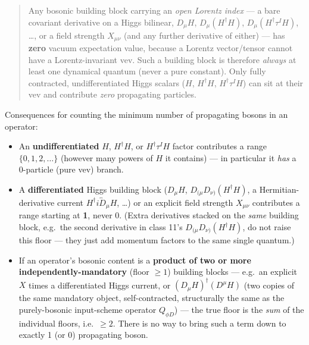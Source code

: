\documentclass[11pt,a4paper]{article}
\begin{document}
\begin{quote}
Any bosonic building block carrying an \emph{open Lorentz index} ---
a bare covariant derivative on a Higgs bilinear, $D_\mu H$, $D_\mu(H^\dagger
H)$, $D_\mu(H^\dagger\tau^I H)$, \ldots, or a field strength $X_{\mu\nu}$
(and any further derivative of either) --- has \textbf{zero} vacuum
expectation value, because a Lorentz vector/tensor cannot have a
Lorentz-invariant vev. Such a building block is therefore \emph{always} at
least one dynamical quantum (never a pure constant). Only fully contracted,
undifferentiated Higgs scalars ($H$, $H^\dagger H$, $H^\dagger\tau^I H$)
can sit at their vev and contribute \emph{zero} propagating particles.
\end{quote}

Consequences for counting the minimum number of propagating bosons in an
operator:
\begin{itemize}
\item An \textbf{undifferentiated} $H$, $H^\dagger H$, or $H^\dagger\tau^I H$
  factor contributes a range $\{0, 1, 2, \ldots\}$ (however many powers of
  $H$ it contains) --- in particular it \emph{has} a 0-particle (pure vev)
  branch.
\item A \textbf{differentiated} Higgs building block ($D_\mu H$,
  $D_{(\mu}D_{\nu)}(H^\dagger H)$, a Hermitian-derivative current
  $H^\dagger i\overleftrightarrow D_\mu H$, \ldots) or an explicit field
  strength $X_{\mu\nu}$ contributes a range starting at \textbf{1}, never 0.
  (Extra derivatives stacked on the \emph{same} building block, e.g.\ the
  second derivative in class 11's $D_{(\mu}D_{\nu)}(H^\dagger H)$, do not
  raise this floor --- they just add momentum factors to the same single
  quantum.)
\item If an operator's bosonic content is a \textbf{product of two or more
  independently-mandatory} (floor $\geq 1$) building blocks --- e.g.\ an
  explicit $X$ times a differentiated Higgs current, or $(D_\mu H)^\dagger
  (D^\mu H)$ (two copies of the same mandatory object, self-contracted,
  structurally the same as the purely-bosonic input-scheme operator
  $Q_{\phi D}$) --- the true floor is the \emph{sum} of the individual
  floors, i.e.\ $\geq 2$. There is no way to bring such a term down to
  exactly 1 (or 0) propagating boson.
\end{itemize}
\end{document}
